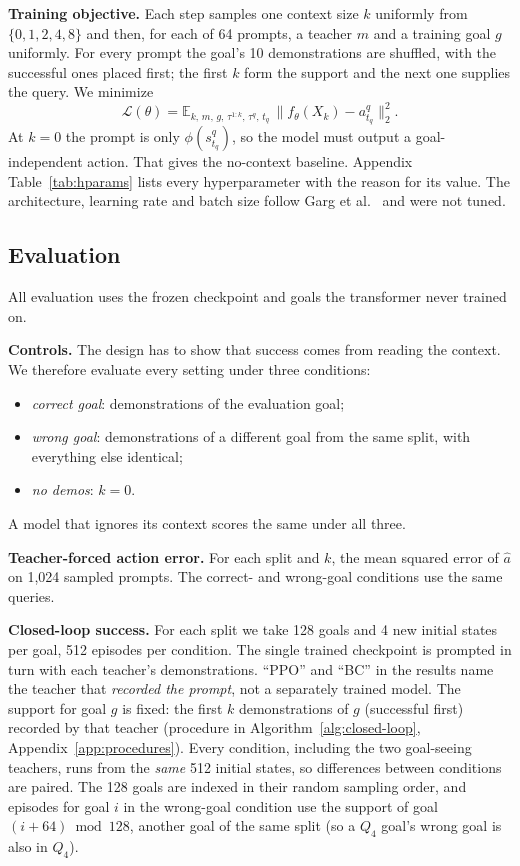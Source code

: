 \textbf{Training objective.} Each step samples one context size $k$ uniformly from $\{0,1,2,4,8\}$ and then, for each of 64
prompts, a teacher $m$ and a training goal $g$ uniformly. For every prompt the goal's 10 demonstrations are shuffled, with the
successful ones placed first; the first $k$ form the support and the next one supplies the query. We minimize
\begin{equation}
  \mathcal{L}(\theta) = \mathbb{E}_{k,\,m,\,g,\,\tau^{1:k},\,\tau^q,\,t_q}\,
  \big\| f_\theta(X_k) - a^q_{t_q} \big\|_2^2 .
  \label{eq:loss}
\end{equation}
At $k = 0$ the prompt is only $\phi(s^q_{t_q})$, so the model must output a goal-independent action. That gives the no-context
baseline.
Appendix Table~\ref{tab:hparams} lists every hyperparameter with the reason for its value. The architecture, learning rate and batch size follow Garg et al.~\cite{garg2022can}
and were not tuned. %

\subsection{Evaluation}
\label{sec:eval}
All evaluation uses the frozen checkpoint and goals the transformer never trained on.

\textbf{Controls.} The design has to show that success comes from reading the context. We therefore evaluate every setting under
three conditions:
\begin{itemize}
  \item \emph{correct goal}: demonstrations of the evaluation goal;
  \item \emph{wrong goal}: demonstrations of a different goal from the same split, with everything else identical;
  \item \emph{no demos}: $k = 0$.
\end{itemize}
A model that ignores its context scores the same under all three.

\textbf{Teacher-forced action error.} For each split and $k$, the mean squared error of $\hat a$ on 1{,}024 sampled prompts.
The correct- and wrong-goal conditions use the same queries.

\textbf{Closed-loop success.} For each split we take 128 goals and 4 new initial states per goal, 512 episodes per condition. The
single trained checkpoint is prompted in turn with each teacher's demonstrations. ``PPO'' and ``BC'' in the results name the
teacher that \emph{recorded the prompt}, not a separately trained model. The support for goal $g$ is fixed: the first $k$
demonstrations of $g$ (successful first) recorded by that teacher (procedure in Algorithm~\ref{alg:closed-loop}, Appendix~\ref{app:procedures}). Every
condition, including the two goal-seeing teachers, runs from the \emph{same} 512 initial states, so differences between conditions
are paired. The 128 goals are indexed in their random sampling order, and episodes for goal $i$ in the wrong-goal condition use
the support of goal $(i + 64) \bmod 128$, another goal of the same split (so a $Q_4$ goal's wrong goal is also in $Q_4$).

